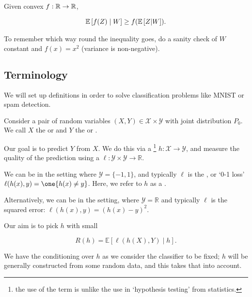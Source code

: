 \documentclass[11pt]{scrartcl}
\begin{document}
\begin{theorem}
Given convex $f:\mathbb R \rightarrow \mathbb R$,

\begin{equation}
    \mathbb{E} \left[ f(Z) \mid W \right] \ge f(\mathbb{E} \left[ Z|W \right]).
\end{equation}
\end{theorem}

To remember which way round the inequality goes, do a sanity check of $W$ constant and $f(x)=x^2$ (variance is non-negative).

\subsection{Terminology}

We will set up definitions in order to solve classification problems like MNIST or spam detection.

Consider a pair of random variables $(X, Y) \in \mathcal{X} \times \mathcal{Y}$ with joint distribution $P_0$. We call $X$ the  or  and $Y$ the  or .

Our goal is to predict $Y$ from $X$. We do this via a \footnote{the use of the term is unlike the use in `hypothesis testing' from statistics.} $h: \mathcal{X} \rightarrow \mathcal{Y}$, and measure the quality of the prediction using a  $\ell : \mathcal{Y} \times \mathcal{Y} \rightarrow \mathbb{R}$.

We can be in the  setting where $\mathcal{Y} = \{ -1, 1 \}$, and typically $\ell$ is the , or `0-1 loss' $\ell (h(x), y) = \one{h(x) \neq y}$. Here, we refer to $h$ as a .

Alternatively, we can be in the  setting, where $\mathcal{Y} = \mathbb{R}$ and typically $\ell$ is the squared error: $\ell(h(x), y) = (h(x) - y)^2$.

Our aim is to pick $h$ with small 

\begin{equation}
    R(h) = \mathbb{E}[\ell(h(X), Y) \mid h].
    \label{L1:Risk Definition}
\end{equation}

We have the conditioning over $h$ as we consider the classifier to be fixed; $h$ will be generally constructed from some random data, and this takes that into account. %
\end{document}
